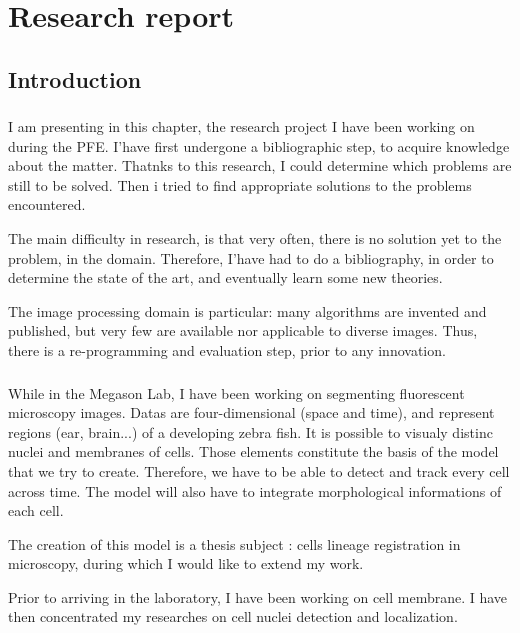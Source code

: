 

\chapter{Research report} 

\section*{Introduction}

\subsection*{}
I am presenting in this chapter, the research project I have been working on during the PFE. I'have first undergone a bibliographic step, to acquire knowledge about the matter. Thatnks to this research, I could determine which problems are still to be solved. Then i tried to find appropriate solutions to the problems encountered.

The main difficulty in research, is that very often, there is no solution yet to the problem, in the domain. Therefore, I'have had to do a bibliography, in order to determine the state of the art, and eventually learn some new theories.

The image processing domain is particular: many algorithms are invented and published, but very few are available nor applicable to diverse images.
Thus, there is a re-programming and evaluation step, prior to any innovation.

\subsection*{}

While in the Megason Lab, I have been working on segmenting fluorescent microscopy images.
Datas are four-dimensional (space and time), and represent regions (ear, brain...) of a developing zebra fish.
It is possible to visualy distinc nuclei and membranes of cells. Those elements constitute the basis of the model that we try to create.
Therefore, we have to be able to detect and track every cell across time. The model will also have to integrate morphological informations of each cell.

The creation of this model is a thesis subject : cells lineage registration in microscopy, during which I would like to extend my work.

Prior to arriving in the laboratory, I have been working on cell membrane. I have then concentrated my researches on cell nuclei detection and localization.






